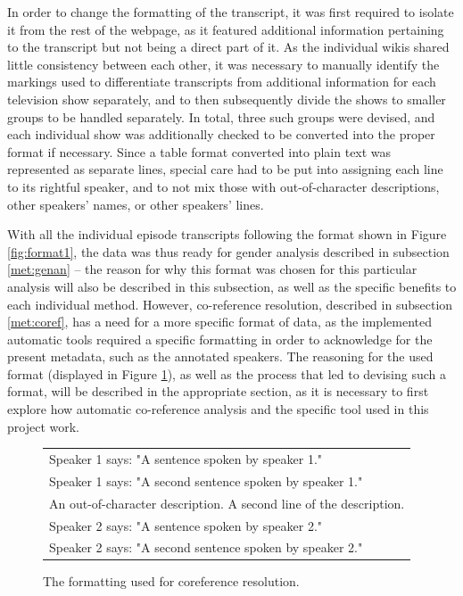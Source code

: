 \documentclass[a4paper, 11pt]{article}
\begin{document}
In order to change the formatting of the transcript, it was first required to isolate it from the rest of the webpage, as it featured additional information pertaining to the transcript but not being a direct part of it. As the individual wikis shared little consistency between each other, it was necessary to manually identify the markings used to differentiate transcripts from additional information for each television show separately, and to then subsequently divide the shows to smaller groups to be handled separately. In total, three such groups were devised, and each individual show was additionally checked to be converted into the proper format if necessary. Since a table format converted into plain text was represented as separate lines, special care had to be put into assigning each line to its rightful speaker, and to not mix those with out-of-character descriptions, other speakers' names, or other speakers' lines.

With all the individual episode transcripts following the format shown in Figure \ref{fig:format1}, the data was thus ready for gender analysis described in subsection \ref{met:genan} -- the reason for why this format was chosen for this particular analysis will also be described in this subsection, as well as the specific benefits to each individual method. However, co-reference resolution, described in subsection \ref{met:coref}, has a need for a more specific format of data, as the implemented automatic tools required a specific formatting in order to acknowledge for the present metadata, such as the annotated speakers. The reasoning for the used format (displayed in Figure \ref{fig:formatcoref}), as well as the process that led to devising such a format, will be described in the appropriate section, as it is necessary to first explore how automatic co-reference analysis and the specific tool used in this project work.

\begin{figure}[h!]
  \centering
  \begin{small}
  \begin{tabular}{l}
  Speaker 1 says: "A sentence spoken by speaker 1." \\
  Speaker 1 says: "A second sentence spoken by speaker 1." \\
  An out-of-character description. A second line of the description. \\
  Speaker 2 says: "A sentence spoken by speaker 2." \\
  Speaker 2 says: "A second sentence spoken by speaker 2." \\
  \end{tabular}
  \end{small}
  \caption{The formatting used for coreference resolution.}
  \label{fig:formatcoref}
\end{figure}
\end{document}
